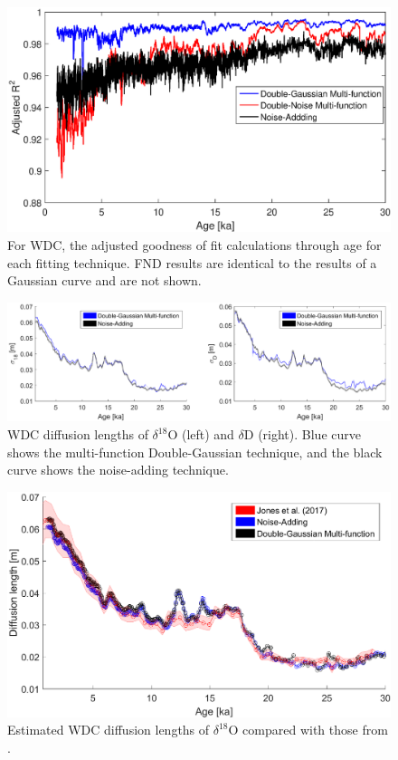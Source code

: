 \documentclass[draft, jgrga]{AGUTeX}
\begin{document}
\begin{figure}
	\includegraphics[width=.9\linewidth]{G_of_fit_1.eps}
	\caption{For WDC, the adjusted goodness of fit calculations through age for each fitting technique. FND results are identical to the results of a Gaussian curve and are not shown.} \label{G_of_fit_1}
\end{figure}

\begin{figure}
	\includegraphics[width=\linewidth]{WAIS_diffusion_adding_noise.eps}
	\caption{WDC diffusion lengths of $\delta^{18}$O (left) and $\delta$D (right). Blue curve shows the multi-function Double-Gaussian technique, and the black curve shows the noise-adding technique.} \label{WAIS_diffusion_adding_noise}
\end{figure}

\begin{figure}
	\includegraphics[width=.9\linewidth]{WAIS_diffusion_lengths.eps}
	\caption{Estimated WDC diffusion lengths of $\delta^{18}$O compared with those from \cite{Jones2017a}.} \label{WAIS_diffusion_lengths}
\end{figure}
\end{document}

